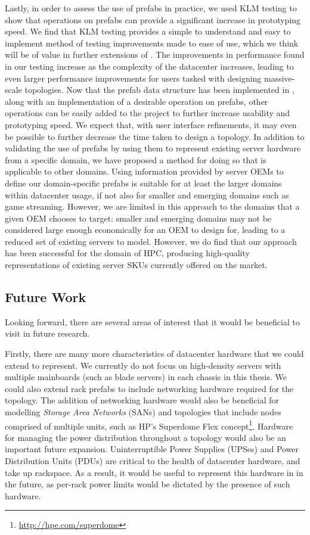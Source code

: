 \documentclass[11pt]{article}
\begin{document}
		Lastly, in order to assess the use of prefabs in practice, we used KLM testing to show that operations on prefabs can provide a significant increase in prototyping speed.
		We find that KLM testing provides a simple to understand and easy to implement method of testing improvements made to ease of use, which we think will be of value in further extensions of \opendc{}.
		The improvements in performance found in our testing increase as the complexity of the datacenter increases, leading to even larger performance improvements for users tasked with designing massive-scale topologies.
		Now that the prefab data structure has been implemented in \opendc{}, along with an implementation of a desirable operation on prefabs, other operations can be easily added to the project to further increase usability and prototyping speed.
		We expect that, with user interface refinements, it may even be possible to further decrease the time taken to design a topology.
		In addition to validating the use of prefabs by using them to represent existing server hardware from a specific domain, we have proposed a method for doing so that is applicable to other domains.
		Using information provided by server OEMs to define our domain-specific prefabs is suitable for at least the larger domains within datacenter usage, if not also for smaller and emerging domains such as game streaming.
		However, we are limited in this approach to the domains that a given OEM chooses to target: smaller and emerging domains may not be considered large enough economically for an OEM to design for, leading to a reduced set of existing servers to model.
		However, we do find that our approach has been successful for the domain of HPC, producing high-quality representations of existing server SKUs currently offered on the market.


	\subsection{Future Work} \label{sec:future-work}
		Looking forward, there are several areas of interest that it would be beneficial to visit in future research.

		Firstly, there are many more characteristics of datacenter hardware that we could extend \opendc{} to represent. 
		We currently do not focus on high-density servers with multiple mainboards (such as blade servers) in each chassis in this thesis. 
		We could also extend rack prefabs to include networking hardware required for the topology. 
		The addition of networking hardware would also be beneficial for modelling \textit{Storage Area Networks} (SANs) and topologies that include nodes comprised of multiple units, such as HP's Superdome Flex concept\footnote{\url{http://hpe.com/superdome}}.
		Hardware for managing the power distribution throughout a topology would also be an important future expansion.
		Uninterruptible Power Supplies (UPSes) and Power Distribution Units (PDUs) are critical to the health of datacenter hardware, and take up rackspace.
		As a result, it would be useful to represent this hardware in \opendc{} in the future, as per-rack power limits would be dictated by the presence of such hardware.
\end{document}

